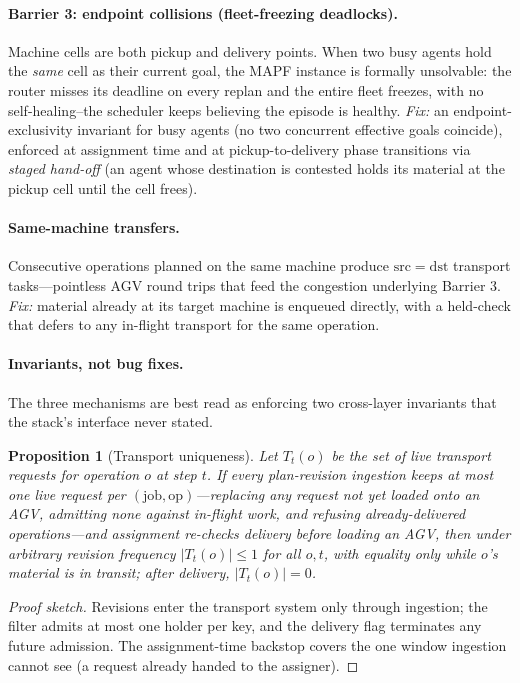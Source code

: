 \documentclass[twocolumn]{article}
\newtheorem{proposition}{Proposition}
\begin{document}
\paragraph{Barrier 3: endpoint collisions (fleet-freezing deadlocks).}
Machine cells are both pickup and delivery points. When two busy agents
hold the \emph{same} cell as their current goal, the MAPF instance is
formally unsolvable: the router misses its deadline on every replan and
the entire fleet freezes, with no self-healing\---the scheduler
keeps believing the episode is healthy. \emph{Fix:} an
endpoint-exclusivity invariant for busy agents (no two concurrent
effective goals coincide), enforced at assignment time and at
pickup-to-delivery phase transitions via \emph{staged hand-off} (an
agent whose destination is contested holds its material at the pickup
cell until the cell frees).

\paragraph{Same-machine transfers.}
Consecutive operations planned on the same machine produce $\mathrm{src}
= \mathrm{dst}$ transport tasks---pointless AGV round trips that feed
the congestion underlying Barrier 3. \emph{Fix:} material already at
its target machine is enqueued directly, with a held-check that defers
to any in-flight transport for the same operation.

\paragraph{Invariants, not bug fixes.}
The three mechanisms are best read as enforcing two cross-layer
invariants that the stack's interface never stated.

\begin{proposition}[Transport uniqueness]\label{prop:uniq}
Let $T_t(o)$ be the set of live transport requests for operation $o$ at
step $t$. If every plan-revision ingestion keeps at most one live request per
$(\mathrm{job},\mathrm{op})$---replacing any request not yet loaded
onto an AGV, admitting none against in-flight work, and refusing
already-delivered operations---and assignment re-checks delivery before
loading an AGV, then under arbitrary revision frequency $|T_t(o)|\le 1$
for all $o,t$, with equality only while $o$'s material is in transit;
after delivery, $|T_t(o)|=0$.
\end{proposition}

\begin{proof}[Proof sketch]
Revisions enter the transport system only through ingestion; the filter
admits at most one holder per key, and the delivery flag terminates any
future admission. The assignment-time backstop covers the one window
ingestion cannot see (a request already handed to the assigner).
\end{proof}
\end{document}
